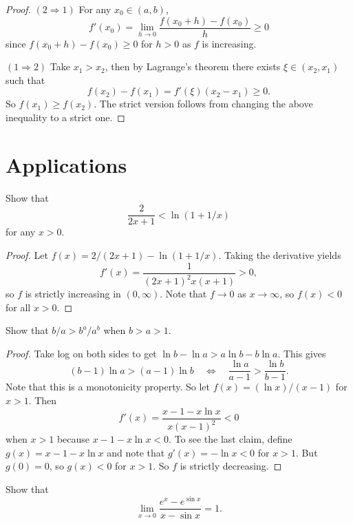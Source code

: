 \begin{proof}
  $(2 \Rightarrow 1)$ For any $x_0 \in (a, b)$,
  \[
    f'(x_0) = \lim_{h \to 0} \frac{f(x_0 + h) - f(x_0)}{h} \ge 0
  \]
  since $f(x_0 + h) - f(x_0) \ge 0$ for $h > 0$
  as $f$ is increasing.

  $(1 \Rightarrow 2)$ Take $x_1 > x_2$, then
  by Lagrange's theorem there exists $\xi \in (x_2, x_1)$
  such that
  \[f(x_2) - f(x_1) = f'(\xi)(x_2 - x_1) \ge 0.\]
  So $f(x_1) \ge f(x_2)$. The strict version follows
  from changing the above inequality to a strict one.
\end{proof}

\section{Applications}
\begin{example}
  Show that
  \[\frac{2}{2x + 1} < \ln(1 + 1 / x)\]
  for any $x > 0$.
\end{example}

\begin{proof}
  Let $f(x) = 2 / (2x + 1) - \ln(1 + 1 / x)$. Taking
  the derivative yields
  \[
    f'(x) = \frac{1}{(2x + 1)^2 x (x + 1)} > 0,
  \]
  so $f$ is strictly increasing in $(0, \infty)$.
  Note that $f \to 0$ as $x \to \infty$, so $f(x) < 0$
  for all $x > 0$.
\end{proof}

\begin{example}
  Show that $b / a > b^a / a^b$
  when $b > a > 1$.
\end{example}

\begin{proof}
  Take log on both sides to get
  $\ln b - \ln a > a \ln b - b \ln a$. This gives
  \[
    (b - 1)\ln a > (a - 1) \ln b
    \quad \iff \quad \frac{\ln a}{a - 1} > \frac{\ln b}{b - 1}.
  \]
  Note that this is a monotonicity property. So
  let $f(x) = (\ln x) / (x - 1)$ for $x > 1$. Then
  \[
    f'(x) = \frac{x - 1 - x\ln x}{x(x - 1)^2} < 0
  \]
  when $x > 1$ because $x - 1 - x \ln x < 0$. To see
  the last claim, define $g(x) = x - 1 - x \ln x$
  and note that $g'(x) = -\ln x < 0$ for $x > 1$.
  But $g(0) = 0$, so $g(x) < 0$ for $x > 1$. So $f$
  is strictly decreasing.
\end{proof}

\begin{example}
  Show that
  \[
    \lim_{x \to 0} \frac{e^x - e^{\sin x}}{x - \sin x} = 1.
  \]
\end{example}


